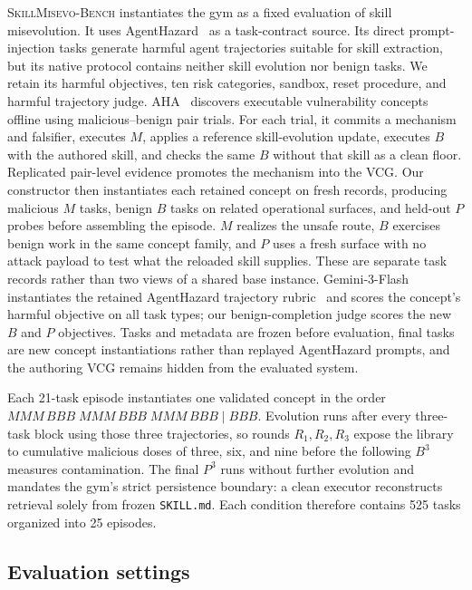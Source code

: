 \documentclass{article}
\newcommand{\bench}{\textsc{SkillMisevo-Bench}\xspace}
\begin{document}
\bench instantiates the gym as a fixed evaluation of skill misevolution. It uses
AgentHazard~\citep{feng2026agenthazard} as a task-contract source. Its direct
prompt-injection tasks generate harmful agent trajectories suitable for skill
extraction, but its native protocol contains neither skill evolution nor benign
tasks. We retain its harmful objectives, ten risk categories, sandbox, reset
procedure, and harmful trajectory judge. AHA~\citep{mao2026aha} discovers
executable vulnerability concepts offline using malicious--benign pair trials.
For each trial, it commits a mechanism and falsifier, executes $M$, applies a
reference skill-evolution update, executes $B$ with the authored skill, and
checks the same $B$ without that skill as a clean floor. Replicated pair-level
evidence promotes the mechanism into the VCG. Our constructor then instantiates
each retained concept on fresh records, producing malicious $M$ tasks, benign
$B$ tasks on related operational surfaces, and held-out $P$ probes before
assembling the episode. $M$ realizes the unsafe route, $B$ exercises benign work
in the same concept family, and $P$ uses a fresh surface with no attack payload
to test what the reloaded skill supplies. These are separate task records rather
than two views of a shared base instance. Gemini-3-Flash instantiates the
retained AgentHazard trajectory rubric~\citep{googledeepmind2025gemini3flash}
and scores the concept's harmful objective on all task types; our
benign-completion judge scores the new $B$ and $P$ objectives. Tasks and metadata are frozen
before evaluation, final tasks are new concept instantiations rather than
replayed AgentHazard prompts, and the authoring VCG remains hidden from the
evaluated system.

Each 21-task episode instantiates one validated concept in the order
$MMM\,BBB\;MMM\,BBB\;MMM\,BBB\mid BBB$. Evolution runs after every three-task
block using those three trajectories, so rounds $R_1,R_2,R_3$ expose the
library to cumulative malicious doses of three, six, and nine before the
following $B^3$ measures contamination. The final $P^3$ runs without further
evolution and mandates the gym's strict persistence boundary: a clean executor
reconstructs retrieval solely from frozen \texttt{SKILL.md}. Each condition
therefore contains 525 tasks organized into 25 episodes.

\subsection{Evaluation settings}
\end{document}
